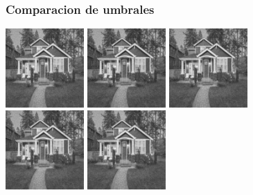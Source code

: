 \documentclass{beamer}
\begin{document}
  \begin{frame}
    \frametitle{ Comparacion de umbrales }
  
    \centering
    \includegraphics[width=3cm]{imgs/Thresholds/2_awt_soft_sym8_House.jpg}
    \includegraphics[width=3cm]{imgs/Thresholds/2_normal_soft_sym8_House.jpg}
    \includegraphics[width=3cm]{imgs/Thresholds/2_universal_soft_sym8_House.jpg}
    \\
    \includegraphics[width=3cm]{imgs/Thresholds/2_bayes_soft_sym8_House.jpg}
    \includegraphics[width=3cm]{imgs/Thresholds/2_level_soft_sym8_House.jpg}
    

  \end{frame}
\end{document}
